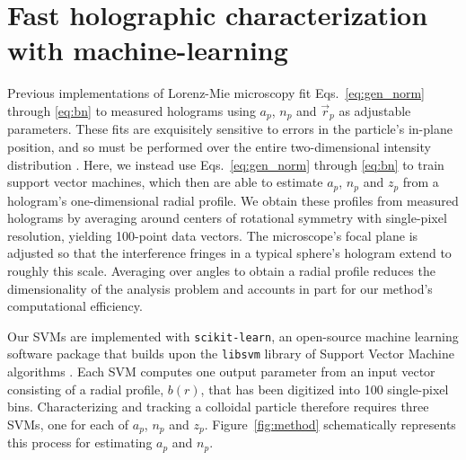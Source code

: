\section{Fast holographic characterization with machine-learning}

Previous implementations of Lorenz-Mie microscopy \cite{lee07a} 
fit Eqs.~\eqref{eq:gen_norm} through \eqref{eq:bn} to measured holograms using $a_p$, $n_p$
and $\vec{r}_p$ as adjustable parameters.
These fits are exquisitely sensitive to errors in the particle's
in-plane position, and so must be performed over the entire
two-dimensional intensity distribution \cite{lee07a}.
Here, we instead use Eqs.~\eqref{eq:gen_norm} through \eqref{eq:bn} to train
support vector machines, which then are able to estimate 
$a_p$, $n_p$ and $z_p$ from a hologram's one-dimensional
radial profile.
We obtain these profiles from measured holograms by averaging
around centers of rotational symmetry \cite{krishnatreya14a}
with single-pixel resolution, yielding 100-point data vectors.
The microscope's focal plane is adjusted so that the interference
fringes in a typical sphere's hologram extend to roughly this scale.
Averaging over angles to obtain a radial profile reduces the
dimensionality of the analysis problem and accounts in
part for our method's computational efficiency.

Our SVMs are 
implemented with {\tt scikit-learn}, an open-source
machine learning software package \cite{pedregosa11} that
builds upon the {\tt libsvm} library of Support Vector Machine algorithms
\cite{chang01,chang02}.
Each SVM computes one output parameter from an input vector
consisting of a radial profile, $b(r)$, that has been digitized
into 100 single-pixel bins.
Characterizing and tracking a colloidal particle therefore requires
three SVMs, one for each of $a_p$, $n_p$ and $z_p$.
Figure~\ref{fig:method} schematically represents this process
for estimating $a_p$ and $n_p$.

